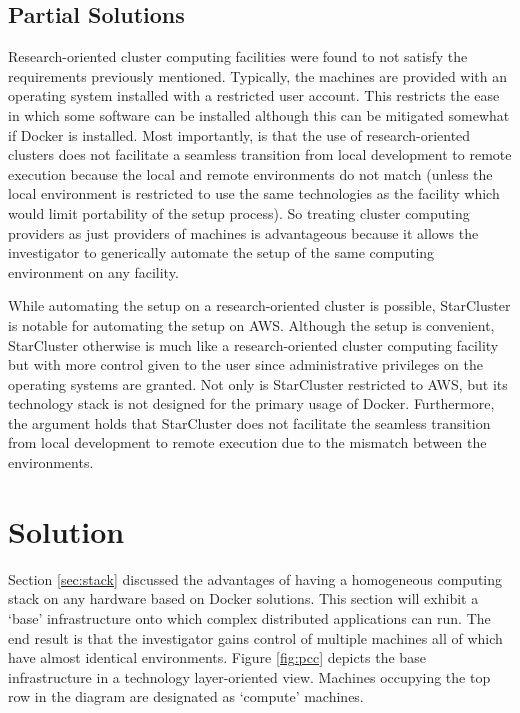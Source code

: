 \subsection{Partial Solutions}


Research-oriented cluster computing facilities were found to not satisfy the requirements previously mentioned.
%
Typically, the machines are provided with an operating system installed with a restricted user account.
%
This restricts the ease in which some software can be installed although this can be mitigated somewhat if \textsf{Docker} is installed.
%
Most importantly, is that the use of research-oriented clusters does not facilitate a seamless transition from local development to remote execution because the local and remote environments do not match (unless the local environment is restricted to use the same technologies as the facility which would limit portability of the setup process).
%
So treating cluster computing providers as just providers of machines is advantageous because it allows the investigator to generically automate the setup of the same computing environment on any facility.


While automating the setup on a research-oriented cluster is possible, \textsf{StarCluster} is notable for automating the setup on \textsf{AWS}.
%
Although the setup is convenient, \textsf{StarCluster} otherwise is much like a research-oriented cluster computing facility but with more control given to the user since administrative privileges on the operating systems are granted.
%
Not only is \textsf{StarCluster} restricted to \textsf{AWS}, but its technology stack is not designed for the primary usage of \textsf{Docker}.
%
Furthermore, the argument holds that \textsf{StarCluster} does not facilitate the seamless transition from local development to remote execution due to the mismatch between the environments.



\section{Solution}


Section \ref{sec:stack} discussed the advantages of having a homogeneous computing stack on any hardware based on \textsf{Docker} solutions.
%
This section will exhibit a `base' infrastructure onto which complex distributed applications can run.
%
The end result is that the investigator gains control of multiple machines all of which have almost identical environments.
%
Figure \ref{fig:pcc} depicts the base infrastructure in a technology layer-oriented view.
%
Machines occupying the top row in the diagram are designated as `compute' machines.

